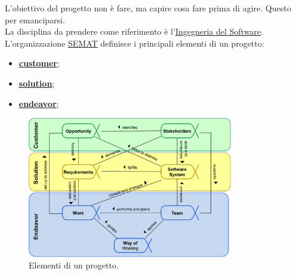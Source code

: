 		L'obiettivo del progetto non è fare, ma capire cosa fare prima di agire. Questo per emanciparsi. \\
		La disciplina da prendere come riferimento è l'\underline{\hyperref[swe]{Ingegneria del Software}}.\\
		L'organizzazione \underline{\hyperref[semat]{SEMAT}} definisce i principali elementi di un progetto:
			\begin{itemize}
				\item \textbf{\underline{\hyperref[customer]{customer}}};
				\item \textbf{\underline{\hyperref[solution]{solution}}};
				\item \textbf{\underline{\hyperref[endeavor]{endeavor}}};
			\end{itemize}
		
		\begin{figure}[H]
			\centering
			\includegraphics[width=0.8\textwidth]{img/prog}		
			\caption{Elementi di un progetto.}
		\end{figure} 
		
		
		\begin{figure}[H]
			\centering
			\qquad
		\end{figure}
		
